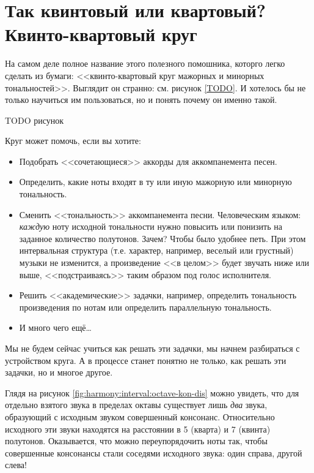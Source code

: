 \section{Так квинтовый или квартовый? Квинто-квартовый круг}
\label{ch:harmony:kvinto-kvarto-round}

На самом деле полное название этого полезного помошника, которго легко сделать из бумаги: <<квинто-квартовый круг мажорных и минорных тональностей>>. Выглядит он странно: см. рисунок \ref{TODO}. И хотелось бы не только научиться им пользоваться, но и понять почему он именно такой.

TODO рисунок

Круг может помочь, если вы хотите:
\begin{itemize}
    \item Подобрать <<сочетающиеся>> аккорды для аккомпанемента песен.
    
    \item Определить, какие ноты входят в ту или иную мажорную или минорную тональность.
    
    \item Сменить <<тональность>> аккомпанемента песни. Человеческим языком: \emph{каждую} ноту исходной тональности нужно повысить или понизить на заданное количество полутонов. Зачем? Чтобы было удобнее петь. При этом интервальная структура (т.е. характер, например, веселый или грустный) музыки не изменится, а произведение <<в целом>> будет звучать ниже или выше, <<подстраиваясь>> таким образом под голос исполнителя.    

    \item Решить <<академические>> задачки, например, определить тональность произведения по нотам или определить параллельную тональность.
    
    \item И много чего ещё\ldots
\end{itemize}

Мы не будем сейчас учиться как решать эти задачки, мы начнем разбираться с устройством круга. А в процессе станет понятно не только, как решать эти задачки, но и многое другое.

Глядя на рисунок \ref{fig:harmony:interval:octave-kon-dis} можно увидеть, что для отдельно взятого звука в пределах октавы существует лишь \emph{два} звука, образующий с исходным звуком совершенный консонанс. Относительно исходного эти звуки находятся на расстоянии в 5 (кварта) и 7 (квинта) полутонов. Оказывается, что можно переупорядочить ноты так, чтобы совершенные консонансы стали соседями исходного звука: один справа, другой слева!

